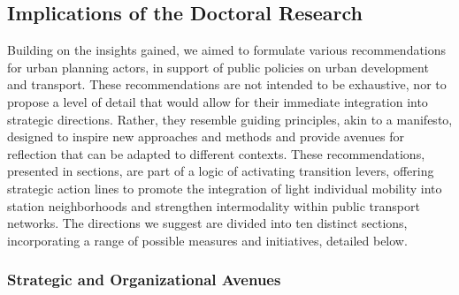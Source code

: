\begin{refsegment}
\section*{Implications of the Doctoral Research
    \label{conclusion-generale:implications}
    }

Building on the insights gained, we aimed to formulate various recommendations for urban planning actors, in support of public policies on urban development and transport. These recommendations are not intended to be exhaustive, nor to propose a level of detail that would allow for their immediate integration into strategic directions. Rather, they resemble guiding principles, akin to a manifesto, designed to inspire new approaches and methods and provide avenues for reflection that can be adapted to different contexts. These recommendations, presented in sections, are part of a logic of activating transition levers, offering strategic action lines to promote the integration of light individual mobility into station neighborhoods and strengthen intermodality within public transport networks. The directions we suggest are divided into ten distinct sections, incorporating a range of possible measures and initiatives, detailed below.%

\subsubsection*{Strategic and Organizational Avenues
    \label{conclusion-generale:implications-gouvernance}
    }


\end{refsegment}
